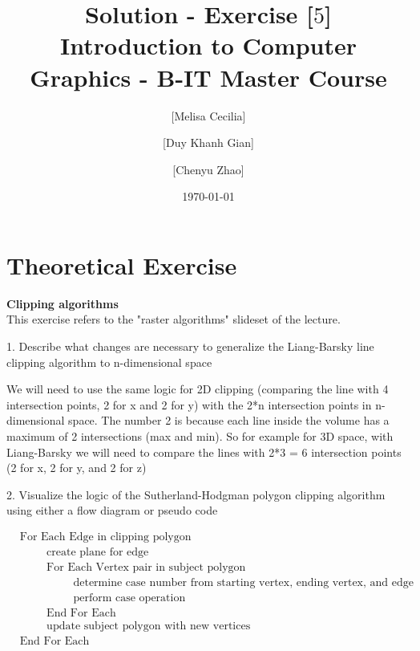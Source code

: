 \documentclass[10pt,a4paper]{article}
\begin{document}
\title{Solution - Exercise [$5$]\\
\small{Introduction to Computer Graphics - B-IT Master Course}}
\author{ [Melisa Cecilia] \and [Duy Khanh Gian] \and [Chenyu Zhao]}
\date{\today}
\maketitle

\section*{Theoretical Exercise}
{\bf Clipping algorithms } \\

This exercise refers to the "raster algorithms" slideset of the lecture.

\begin{flushleft}
1. Describe what changes are necessary to generalize the Liang-Barsky line clipping algorithm to n-dimensional space
\end{flushleft}

We will need to use the same logic for 2D clipping (comparing the line with 4 intersection points, 2 for x and 2 for y) with the 2*n intersection points in n-dimensional space. The number 2 is because each line inside the volume has a maximum of 2 intersections (max and min). So for example for 3D space, with Liang-Barsky we will need to compare the lines with 2*3 = 6 intersection points (2 for x, 2 for y, and 2 for z) \\
 
\begin{flushleft}
2. Visualize the logic of the Sutherland-Hodgman polygon clipping algorithm using either a flow diagram or pseudo code
\end{flushleft}

\begin{align*}
  &\text{For Each Edge in clipping polygon} \\
  & \hspace{1cm} \text{create plane for edge} \\
  & \hspace{1cm} \text{For Each Vertex pair in subject polygon} \\
  	& \hspace{2cm} \text{determine case number from starting vertex, ending vertex, and edge} \\
	& \hspace{2cm} \text{perform case operation} \\
  & \hspace{1cm} \text{End For Each} \\
  & \hspace{1cm} \text{update subject polygon with new vertices} \\
  &\text{End For Each}
\end{align*}
\end{document}
